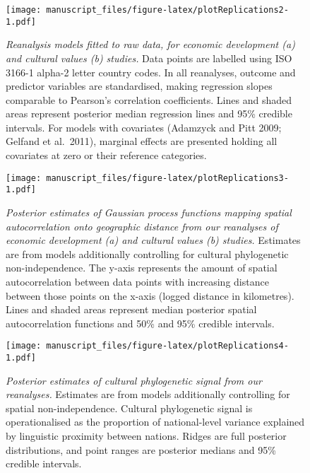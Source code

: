 \documentclass[
  english,
  man,floatsintext]{apa6}
\begin{document}
\begin{appendix}
\newpage











\begin{figure}
\centering
\texttt{[image: manuscript\_files/figure-latex/plotReplications2-1.pdf]}
\caption{\label{fig:plotReplications2}\emph{Reanalysis models fitted to raw
data, for economic development (a) and cultural values (b) studies.}
Data points are labelled using ISO 3166-1 alpha-2 letter country codes.
In all reanalyses, outcome and predictor variables are standardised,
making regression slopes comparable to Pearson's correlation
coefficients. Lines and shaded areas represent posterior median
regression lines and 95\% credible intervals. For models with covariates
(Adamzyck and Pitt 2009; Gelfand et al.~2011), marginal effects are
presented holding all covariates at zero or their reference categories.}
\end{figure}

\newpage











\begin{figure}
\centering
\texttt{[image: manuscript\_files/figure-latex/plotReplications3-1.pdf]}
\caption{\label{fig:plotReplications3}\emph{Posterior estimates of Gaussian
process functions mapping spatial autocorrelation onto geographic
distance from our reanalyses of economic development (a) and cultural
values (b) studies.} Estimates are from models additionally controlling
for cultural phylogenetic non-independence. The y-axis represents the
amount of spatial autocorrelation between data points with increasing
distance between those points on the x-axis (logged distance in
kilometres). Lines and shaded areas represent median posterior spatial
autocorrelation functions and 50\% and 95\% credible intervals.}
\end{figure}

\newpage









\begin{figure}
\centering
\texttt{[image: manuscript\_files/figure-latex/plotReplications4-1.pdf]}
\caption{\label{fig:plotReplications4}\emph{Posterior estimates of cultural
phylogenetic signal from our reanalyses.} Estimates are from models
additionally controlling for spatial non-independence. Cultural
phylogenetic signal is operationalised as the proportion of
national-level variance explained by linguistic proximity between
nations. Ridges are full posterior distributions, and point ranges are
posterior medians and 95\% credible intervals.}
\end{figure}


\end{appendix}
\end{document}
